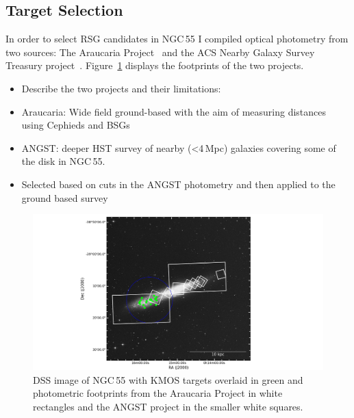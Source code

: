 \subsection{Target Selection} %
\label{sub:target_selection}

In order to select RSG candidates in NGC\,55 I compiled optical photometry from two sources: The Araucaria Project~\citep{2005Msngr.121...23G} and the ACS Nearby Galaxy Survey Treasury project~\citep[ANGST][]{2009ApJS..183...67D}.
Figure~\ref{fig:ngc55-foot} displays the footprints of the two projects.

\begin{itemize}
  \item Describe the two projects and their limitations:
  \item Araucaria: Wide field ground-based with the aim of measuring distances using Cephieds and BSGs
  \item ANGST: deeper HST survey of nearby (<4\,Mpc) galaxies covering some of the disk in NGC\,55.
  \item Selected based on cuts in the ANGST photometry and then applied to the ground based survey
\end{itemize}

\begin{figure}
 \centering
 \includegraphics[width=\textwidth]{ngc55/ngc55_fields-v3}
 \caption[DSS image of NGC\,55 with KMOS and photometric footprints highlighted]{
          DSS image of NGC\,55 with KMOS targets overlaid in green and photometric footprints from the Araucaria Project
          \protect\citep{2005Msngr.121...23G} in white rectangles
          and the ANGST project
          \protect\citep{2009ApJS..183...67D} in the smaller white squares.
         }
 \label{fig:ngc55-foot}
\end{figure}


